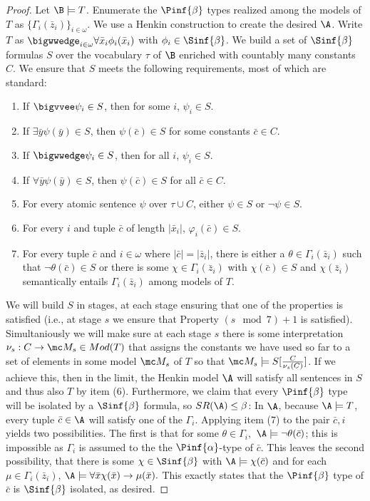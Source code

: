 \documentclass[10pt,a4paper]{amsart}
\renewcommand{\-}{\text{-}}
\begin{document}
\havingPimodels

\begin{proof}
Let $\B\models T$.
Enumerate the $\Pinf{\beta}$ types realized among the models of $T$ as $\{\Gamma_i(\bar{z}_i)\}_{i\in\omega}$.
We use a Henkin construction to create the desired $\A$.
Write $T$ as $\bigwwedge_{i\in\omega} \forall \bar{x}_i \phi_i(\bar{x}_i)$ with $\phi_i\in \Sinf{\beta}$.
We build a set of $\Sinf{\beta}$ formulas $S$ over the vocabulary $\tau$ of $\B$ enriched with countably many constants $C$.
We ensure that $S$ meets the following requirements, most of which are standard:
		\begin{enumerate}
			\item If $\bigvvee \psi_i \in S$, then for some $i$, $\psi_i \in S$.
			\item If $\exists \bar y \psi(\bar y) \in S$, then $\psi(\bar c) \in S$ for some constants $\bar c \in C$.
			\item If $\bigwwedge \psi_i \in S$, then for all $i$, $\psi_i \in S$.
			\item If $\forall \bar y \psi(\bar y) \in S$, then $\psi(\bar c) \in S$ for all $\bar c \in C$.
			\item For every atomic sentence $\psi$ over $\tau \cup C$, either $\psi \in S$ or $\neg \psi \in S$.
			\item For every $i$ and tuple $\bar{c}$ of length $\vert \bar{x}_i \vert$, $\varphi_i(\bar{c})\in S$.
			\item For every tuple $\bar{c}$ and $i\in\omega$ where $|\bar{c}|=|\bar{z}_i|$, there is either a $\theta\in \Gamma_i(\bar{z}_i)$ such that $\lnot\theta(\bar{c})\in S$ or there is some $\chi\in\Gamma_i(\bar{z}_i)$ with $\chi(\bar{c})\in S$ and $\chi(\bar{z}_i)$ semantically entails $\Gamma_i(\bar{z}_i)$ among models of $T$.
		\end{enumerate}
    We will build $S$ in stages, at each stage ensuring that one of the properties is satisfied (i.e., at stage $s$ we ensure that Property $(s\mod 7)+1$ is satisfied). Simultaniously we will make sure at each stage $s$ there is some interpretation $\nu_s:C\to \mc M_s \in Mod(T)$ that assigns the constants we have used so far to a set of elements in some model $\mc M_s$ of $T$ so that $\mc M_s\models S[\frac{C}{\nu_s(C)}]$.
		If we achieve this, then in the limit, the Henkin model $\A$ will satisfy all sentences in $S$ and thus also $T$ by item (6).
		Furthermore, we claim that every $\Pinf{\beta}$ type will be isolated by a $\Sinf{\beta}$ formula, so $SR(\A)\leq \beta$:
		In $\A$, because $\A\models T$, every tuple $\bar c\in \A$ will satisfy one of the $\Gamma_i$.
		Applying item (7) to the pair $\bar c,i$ yields two possibilities.
		The first is that for some $\theta\in\Gamma_i,$ $\A\models\lnot \theta(\bar{c})$; this is impossible as $\Gamma_i$ is assumed to the the $\Pinf{\alpha}$-type of $\bar{c}$.
		This leaves the second possibility, that there is some $\chi\in\Sinf{\beta}$ with $\A\models\chi(\bar{c})$ and for each $\mu\in\Gamma_i(\bar{z}_i)$, $\A\models\forall \bar x\chi(\bar x)\to \mu(\bar x).$
		This exactly states that the $\Pinf{\beta}$ type of $\bar{c}$ is $\Sinf{\beta}$ isolated, as desired.
		

\end{proof}
\end{document}
